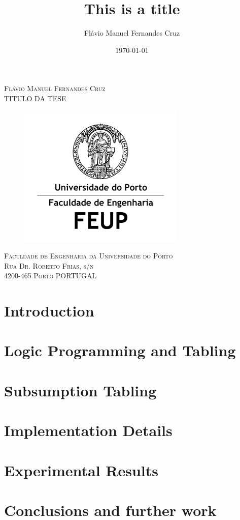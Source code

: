 \documentclass[12pt]{report}
\title{\fontsize{20}{30}\bfseries This is a title}
\author{Flávio Manuel Fernandes Cruz \\}
\date{\today}
\begin{document}
  
\begin{titlepage}

\begin{center}
  
\textsc{\large Flávio Manuel Fernandes Cruz}\\[1.5cm]

\textsc{\LARGE TITULO DA TESE}
\begin{figure}[ht]
  \centering
  \includegraphics[scale=0.7]{04.png}
\end{figure}


\textsc{\large Faculdade de Engenharia da Universidade do Porto\\ \small Rua Dr. Roberto Frias, s/n \\ 4200-465 Porto PORTUGAL}\\[1.5cm]
  
\end{center}
\end{titlepage}

\tableofcontents
\listoffigures
\listoftables
\lstlistoflistings
\listofalgorithms
\clearpage

\chapter{Introduction}


\chapter{Logic Programming and Tabling}


\chapter{Subsumption Tabling}
\chapter{Implementation Details}
\chapter{Experimental Results}
\chapter{Conclusions and further work}
  
\renewcommand{\bibname}{References}

{}
\end{document}

